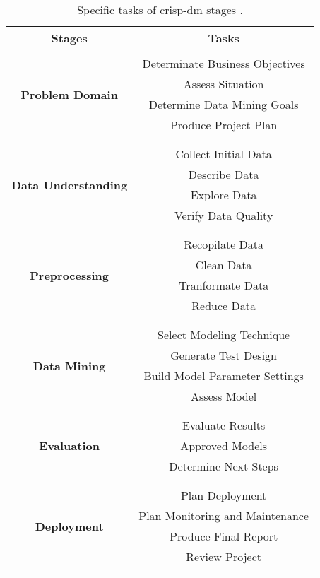\begin{table}[H]
    \begin{center}
        \begin{tabular}{| c | c |}
            \hline
            \textbf{Stages} & \textbf{Tasks} \\ \hline
            \multirow{6}{*}{\textbf{Problem Domain}} & \\ 
             & Determinate Business Objectives \\
             & Assess Situation \\
             & Determine Data Mining Goals \\
             & Produce Project Plan \\
             & \\ \hline
            \multirow{6}{*}{\textbf{Data Understanding}} & \\
             & Collect Initial Data \\
             & Describe Data \\
             & Explore Data \\
             & Verify Data Quality \\
             & \\ \hline
            \multirow{6}{*}{\textbf{Preprocessing}} & \\
             & Recopilate Data \\
             & Clean Data \\
             & Tranformate Data \\
             & Reduce Data \\
             & \\ \hline
            \multirow{6}{*}{\textbf{Data Mining}} & \\
             & Select Modeling Technique \\
             & Generate Test Design \\
             & Build Model Parameter Settings \\
             & Assess Model \\
             & \\ \hline
            \multirow{5}{*}{\textbf{Evaluation}} & \\
             & Evaluate Results \\
             & Approved Models \\
             & Determine Next Steps \\
             & \\ \hline
            \multirow{6}{*}{\textbf{Deployment}} & \\
             & Plan Deployment \\
             & Plan Monitoring and Maintenance \\
             & Produce Final Report \\
             & Review Project \\ 
             & \\ \hline
        \end{tabular}
        \caption{Specific tasks of \acrshort{crisp-dm} stages \cite{visual-crisp-dm}.}
        \label{tab:crisp-dm}
    \end{center}
\end{table}

